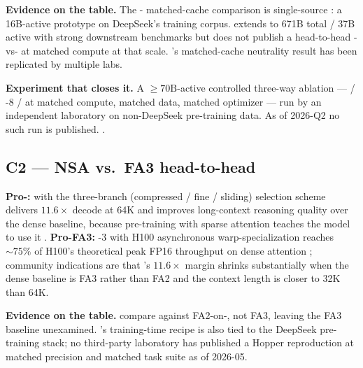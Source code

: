 \textbf{Evidence on the table.} The - matched-cache comparison is
single-source \citep[\S 2.1.4]{deepseek-v2}: a 16B-active prototype on
DeepSeek's training corpus. \citet{deepseek-v3} extends  to 671B
total / 37B active with strong downstream benchmarks but does not
publish a head-to-head -vs- at matched compute at that scale.
's matched-cache neutrality result \citep{ainslie2023} has been
replicated by multiple labs.

\textbf{Experiment that closes it.} A $\geq 70\mathrm{B}$-active
controlled three-way ablation ---  / -8 /  at matched compute,
matched data, matched optimizer --- run by an independent laboratory on
non-DeepSeek pre-training data. As of 2026-Q2 no such run is published.
.

\subsection{C2 --- NSA vs.\ FA3 head-to-head}
\label{sec:c-nsa}

\textbf{Pro-:}  with the three-branch
(compressed / fine / sliding) selection scheme delivers $11.6\times$
decode at 64K and improves long-context reasoning quality over the
dense baseline, because pre-training with sparse attention teaches the
model to use it \citep{yuan2025}. \textbf{Pro-FA3:} -3
with H100 asynchronous warp-specialization reaches $\sim 75\%$ of
H100's theoretical peak FP16 throughput on dense attention
\citep{shah2024}; community indications are that 's $11.6\times$
margin shrinks substantially when the dense baseline is FA3 rather than
FA2 and the context length is closer to 32K than 64K.

\textbf{Evidence on the table.} \citet{yuan2025} compare against
FA2-on-, not FA3, leaving the FA3 baseline unexamined. 's
training-time recipe is also tied to the DeepSeek pre-training stack;
no third-party laboratory has published a Hopper reproduction at
matched precision and matched task suite as of 2026-05.

